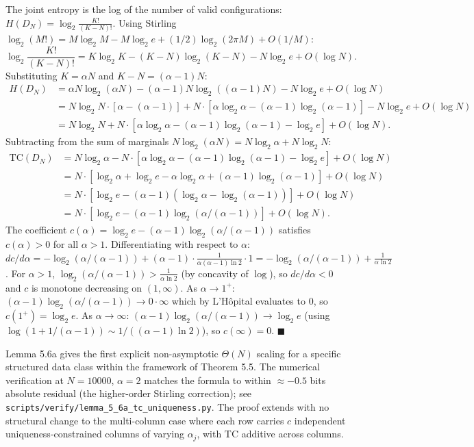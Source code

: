 \documentclass[
]{article}
\begin{document}
The joint entropy is the log of the number of valid configurations:
$H(D_N) = \log_2 \frac{K!}{(K-N)!}$.
Using Stirling
$\log_2(M!) = M \log_2 M - M \log_2 e + (1/2)\log_2(2\pi M) + O(1/M)$:
\[
\log_2 \frac{K!}{(K-N)!}
= K \log_2 K - (K-N) \log_2(K-N) - N \log_2 e + O(\log N).
\]
Substituting $K = \alpha N$ and $K-N = (\alpha-1) N$:
\[
\begin{aligned}
H(D_N) &= \alpha N \log_2(\alpha N) - (\alpha-1) N \log_2((\alpha-1) N) - N \log_2 e + O(\log N) \\
&= N \log_2 N \cdot [\alpha - (\alpha-1)] + N \cdot [\alpha \log_2 \alpha - (\alpha-1) \log_2(\alpha-1)] - N \log_2 e + O(\log N) \\
&= N \log_2 N + N \cdot [\alpha \log_2 \alpha - (\alpha-1) \log_2(\alpha-1) - \log_2 e] + O(\log N).
\end{aligned}
\]
Subtracting from the sum of marginals
$N \log_2(\alpha N) = N \log_2 \alpha + N \log_2 N$:
\[
\begin{aligned}
\mathrm{TC}(D_N) &= N \log_2 \alpha - N \cdot [\alpha \log_2 \alpha - (\alpha-1) \log_2(\alpha-1) - \log_2 e] + O(\log N) \\
&= N \cdot [\log_2 \alpha + \log_2 e - \alpha \log_2 \alpha + (\alpha-1) \log_2(\alpha-1)] + O(\log N) \\
&= N \cdot [\log_2 e - (\alpha-1)(\log_2 \alpha - \log_2(\alpha-1))] + O(\log N) \\
&= N \cdot [\log_2 e - (\alpha-1) \log_2(\alpha/(\alpha-1))] + O(\log N).
\end{aligned}
\]
The coefficient
$c(\alpha) = \log_2 e - (\alpha-1) \log_2(\alpha/(\alpha-1))$
satisfies $c(\alpha) > 0$ for all $\alpha > 1$. Differentiating with
respect to $\alpha$:
$dc/d\alpha = -\log_2(\alpha/(\alpha-1)) + (\alpha-1) \cdot \frac{1}{\alpha(\alpha-1)\ln 2} \cdot 1
= -\log_2(\alpha/(\alpha-1)) + \frac{1}{\alpha \ln 2}$.
For $\alpha > 1$, $\log_2(\alpha/(\alpha-1)) > \frac{1}{\alpha \ln 2}$
(by concavity of $\log$), so $dc/d\alpha < 0$ and $c$ is monotone
decreasing on $(1, \infty)$. As $\alpha \to 1^+$:
$(\alpha-1) \log_2(\alpha/(\alpha-1)) \to 0 \cdot \infty$ which by
L'H\^opital evaluates to $0$, so $c(1^+) = \log_2 e$. As
$\alpha \to \infty$:
$(\alpha-1) \log_2(\alpha/(\alpha-1)) \to \log_2 e$ (using
$\log(1 + 1/(\alpha-1)) \sim 1/((\alpha-1) \ln 2)$), so $c(\infty) = 0$.
\hfill$\blacksquare$

Lemma 5.6a gives the first explicit non-asymptotic $\Theta(N)$
scaling for a specific structured data class within the framework
of Theorem 5.5. The numerical verification at $N = 10000$,
$\alpha = 2$ matches the formula to within $\approx -0.5$ bits
absolute residual (the higher-order Stirling correction);
see \texttt{scripts/verify/lemma\_5\_6a\_tc\_uniqueness.py}.
The proof extends with no structural change to the multi-column
case where each row carries $c$ independent uniqueness-constrained
columns of varying $\alpha_j$, with TC additive across columns.
\end{document}
